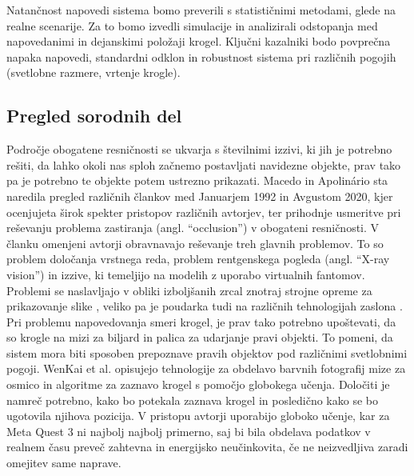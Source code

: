 \documentclass[a4paper, 12pt]{article}
\newcommand\cmnt[1]{\textcolor{munsell}{#1}}
\begin{document}
Natančnost napovedi sistema bomo preverili s statističnimi metodami, glede na realne scenarije. Za to bomo izvedli simulacije in analizirali odstopanja med napovedanimi in dejanskimi položaji krogel. Ključni kazalniki bodo povprečna napaka napovedi, standardni odklon in robustnost sistema pri različnih pogojih (svetlobne razmere, vrtenje krogle).


\subsection{Pregled sorodnih del}
Področje obogatene resničnosti se ukvarja s številnimi izzivi, ki jih je potrebno rešiti, da lahko okoli nas sploh začnemo postavljati navidezne objekte, prav tako pa je potrebno te objekte potem ustrezno prikazati.
Macedo in Apolinário \cite{Macedo2023Occlusion} sta naredila pregled različnih člankov med Januarjem 1992 in Avgustom 2020,  kjer  ocenjujeta širok spekter pristopov različnih avtorjev, ter prihodnje usmeritve pri reševanju problema zastiranja (angl. ``occlusion'') v obogateni resničnosti. V članku omenjeni avtorji \cite{Krajancich2020Factored} obravnavajo reševanje 
treh glavnih problemov. To so problem določanja vrstnega reda, problem rentgenskega pogleda (angl. ``X-ray vision'') in izzive, ki temeljijo na modelih z uporabo virtualnih fantomov. Problemi se naslavljajo v obliki izboljšanih zrcal znotraj strojne opreme za prikazovanje slike \cite{Krajancich2020Factored}, veliko pa je poudarka tudi na različnih tehnologijah zaslona \cite{Zhang2023AddOn}.\\
Pri problemu napovedovanja smeri krogel, je prav tako potrebno upoštevati, da so krogle na mizi za biljard in palica za udarjanje pravi objekti. To pomeni, da sistem mora biti sposoben prepoznave pravih objektov pod različnimi svetlobnimi pogoji. WenKai et al. \cite{WenKai2024} opisujejo tehnologije za
obdelavo barvnih fotografij mize za osmico in algoritme za zaznavo krogel s pomočjo globokega učenja. Določiti je namreč potrebno, kako bo potekala zaznava krogel in posledično kako se bo ugotovila njihova pozicija. V pristopu avtorji uporabijo globoko učenje, kar za Meta
Quest 3 ni najbolj najbolj primerno, saj bi bila obdelava podatkov v realnem času preveč zahtevna in energijsko neučinkovita, če ne neizvedljiva zaradi omejitev same naprave.
\end{document}
